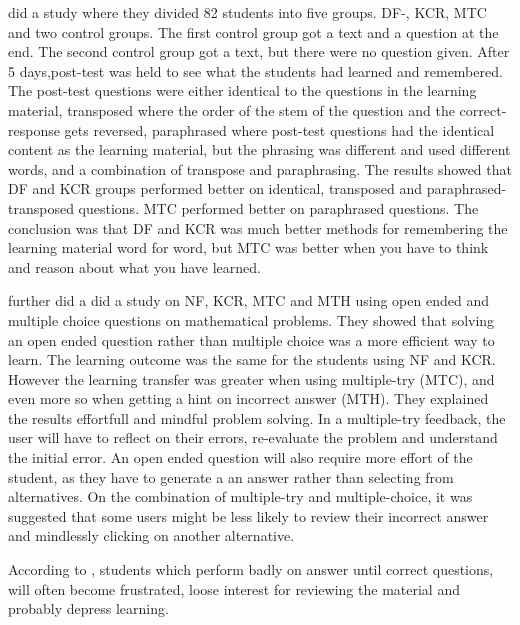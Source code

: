 \textcite{Clariana2006} did a study where they divided 82 students into five groups. DF-, KCR, MTC and two control groups. The first control group got a text and a question at the end. The second control group got a text, but there were no question given. After 5 days,post-test was held to see what the students had learned and remembered. The post-test questions were either identical to the questions in the learning material, transposed where the order of the stem of the question and the correct-response gets reversed, paraphrased where post-test questions had the identical content as the learning material, but the phrasing was different and used different words, and a combination of transpose and paraphrasing. The results showed that DF and KCR groups performed better on identical, transposed and paraphrased-transposed questions. MTC performed better on paraphrased questions. The conclusion was that DF and KCR was much better methods for remembering the learning material word for word, but MTC was better when you have to think and reason about what you have learned.

\textcite{Attali2015} further did a did a study on NF, KCR, MTC and MTH using open ended and multiple choice questions on mathematical problems. They showed that solving an open ended question rather than multiple choice was a more efficient way to learn. The learning outcome was the same for the students using NF and KCR. However the learning transfer was greater when using multiple-try (MTC), and even more so when getting a hint on incorrect answer (MTH). They explained the results effortfull and mindful problem solving. In a multiple-try feedback, the user will have to reflect on their errors, re-evaluate the problem and understand the initial error. An open ended question will also require more effort of the student, as they have to generate a an answer rather than selecting from alternatives. On the combination of multiple-try and multiple-choice, it was suggested that some users might be less likely to review their incorrect answer and mindlessly clicking on another alternative. 



According to \textcite{Morrison1995}, students which perform badly on answer until correct questions,  will often become frustrated, loose interest for reviewing the material and probably depress learning.



